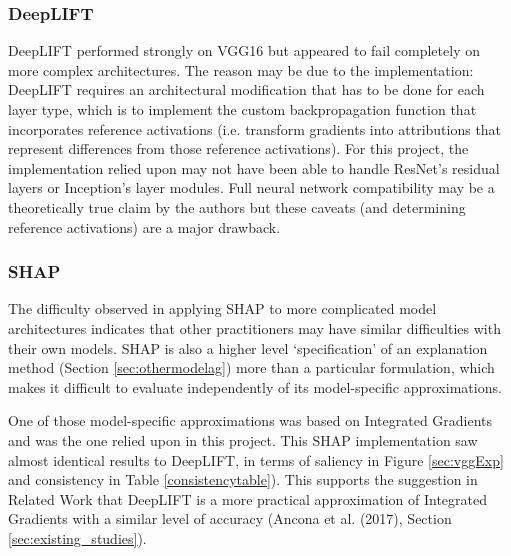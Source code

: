 \documentclass[main]{subfiles}
\begin{document}
\subsubsection{DeepLIFT}

DeepLIFT performed strongly on VGG16 but appeared to fail completely on more complex architectures. The reason may be due to the implementation: DeepLIFT requires an architectural modification that has to be done for each layer type, which is to implement the custom backpropagation function that incorporates reference activations (i.e. transform gradients into attributions that represent differences from those reference activations). For this project, the implementation relied upon may not have been able to handle ResNet's residual layers or Inception's layer modules. Full neural network compatibility may be a theoretically true claim by the authors but these caveats (and determining reference activations) are a major drawback.



\subsubsection{SHAP}
The difficulty observed in applying SHAP to more complicated model architectures indicates that other practitioners may have similar difficulties with their own models. SHAP is also a higher level `specification' of an explanation method (Section \ref{sec:othermodelag}) more than a particular formulation, which makes it difficult to evaluate independently of its model-specific approximations.

One of those model-specific approximations was based on Integrated Gradients and was the one relied upon in this project. This SHAP implementation saw almost identical results to DeepLIFT, in terms of saliency in Figure \ref{sec:vggExp} and consistency in Table \ref{consistencytable}). This supports the suggestion in Related Work that DeepLIFT is a more practical approximation of Integrated Gradients with a similar level of accuracy (Ancona et al. (2017), Section \ref{sec:existing_studies}).
\end{document}
